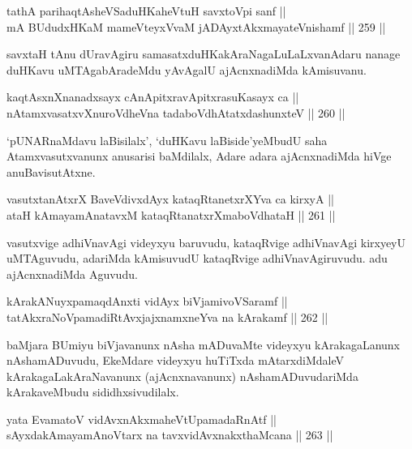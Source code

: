 \begin{shl}
tathA parihaqtAsheVSaduHKaheVtuH savxtoV\s pi sanf || \\
mA BUdudxHKaM mameVteyxVvaM jADAyxtAkxmayateV\s nishamf ||  259 || 
\end{shl}

\begin{artha}
savxtaH tAnu dUravAgiru samasatxduHKakAraNagaLuLaLxvanAdaru nanage
duHKavu uMTAgabAradeMdu yAvAgalU ajAcnxnadiMda kAmisuvanu.
\end{artha}

\begin{shl}
kaqtAsxnXnanadxsayx cAnApitxravApitxrasuKasayx ca || \\
nA\s \s tamxvasatxvXnuroVdheVna tadaboVdhAtatxdashunxteV ||  260 ||  
\end{shl}

\begin{artha}
`pUNARnaMdavu laBisilalx', `duHKavu laBiside'yeMbudU saha
Atamxvasutxvanunx anusarisi baMdilalx, Adare adara ajAcnxnadiMda hiVge anuBavisutAtxne.
\end{artha}

\begin{shl}
vasutxtanAtxrX BaveVdivxdAyx kataqRtanetxrXYva ca kirxyA ||  \\
ataH kAmayamAnatavxM kataqRtanatxrXmaboVdhataH ||  261 ||  
\end{shl}

\begin{artha}
vasutxvige adhiVnavAgi videyxyu baruvudu, kataqRvige adhiVnavAgi
kirxyeyU uMTAguvudu, adariMda kAmisuvudU kataqRvige adhiVnavAgiruvudu.
adu ajAcnxnadiMda Aguvudu.
\end{artha}

\begin{shl}
kArakANuyxpamaqdAnxti vidAyx biVjamivoVSaramf || \\
tatAkxraNoVpamadiRtAvxjajxnamxneYva na kArakamf ||  262 ||  
\end{shl}

\begin{artha}
baMjara BUmiyu biVjavanunx nAsha mADuvaMte videyxyu kArakagaLanunx
nAshamADuvudu, EkeMdare videyxyu huTiTxda mAtarxdiMdaleV
kArakagaLakAraNavanunx (ajAcnxnavanunx) nAshamADuvudariMda
kArakaveMbudu sididhxsivudilalx.
\end{artha}

\begin{shl}
yata EvamatoV vidAvxnAkxmaheVtUpamadaRnAtf || \\
sAyxdakAmayamAnoV\s tarx na tavxvidAvxnakxthaMcana ||  263 ||  
\end{shl}

